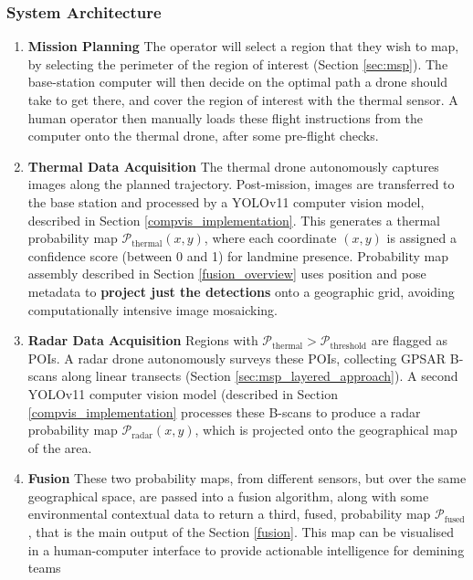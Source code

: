 

    \subsubsection{System Architecture} \label{compvis_methods}
    
        \begin{enumerate}
        
            \item \textbf{Mission Planning} The operator will select a region that they wish to map, by selecting the perimeter of the region of interest (Section \ref{sec:msp}). The base-station computer will then decide on the optimal path a drone should take to get there, and cover the region of interest with the thermal sensor. A human operator then manually loads these flight instructions from the computer onto the thermal drone, after some pre-flight checks.
            
            \item \textbf{Thermal Data Acquisition} The thermal drone autonomously captures images along the planned trajectory. Post-mission, images are transferred to the base station and processed by a YOLOv11 computer vision model, described in Section \ref{compvis_implementation}. This generates a thermal probability map \newline \(\mathcal{P}_{\text{thermal}}(x,y)\), where each coordinate \((x,y)\) is assigned a confidence score (between 0 and 1) for landmine presence. Probability map assembly described in Section \ref{fusion_overview} uses position and pose metadata to \textbf{project just the detections} onto a geographic grid, avoiding computationally intensive image mosaicking.
            
            \item \textbf{Radar Data Acquisition} Regions with \(\mathcal{P}_{\text{thermal}} > \mathcal{P}_{\text{threshold}}\) are flagged as \gls{POI}s. A radar drone autonomously surveys these \gls{POI}s, collecting GPSAR B-scans along linear transects (Section \ref{sec:msp_layered_approach}). A second YOLOv11 computer vision model (described in Section \ref{compvis_implementation} processes these B-scans to produce a radar probability map \(\mathcal{P}_{\text{radar}}(x,y)\), which is projected onto the geographical map of the area.
            
            \item \textbf{Fusion} These two probability maps, from different sensors, but over the same geographical space, are passed into a fusion algorithm, along with some environmental contextual data to return a third, fused, probability map $\mathcal{P}_{\text{fused}}$, that is the main output of the Section \ref{fusion}. This map can be visualised in a human-computer interface to provide actionable intelligence for demining teams
            
        \end{enumerate}


